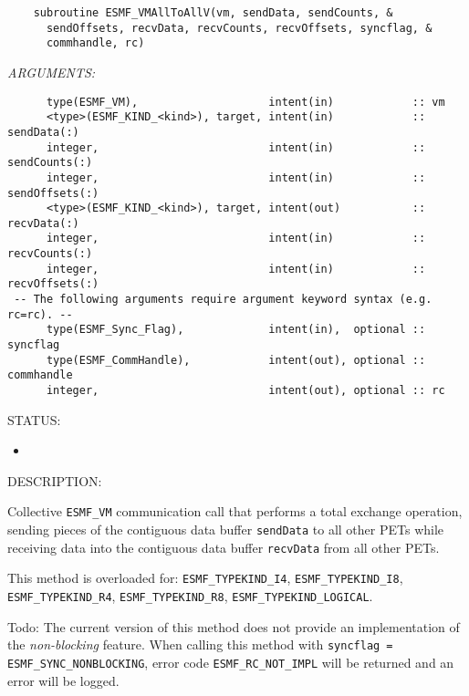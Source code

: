   
\begin{verbatim}    subroutine ESMF_VMAllToAllV(vm, sendData, sendCounts, &
      sendOffsets, recvData, recvCounts, recvOffsets, syncflag, &
      commhandle, rc)\end{verbatim}{\em ARGUMENTS:}
\begin{verbatim}      type(ESMF_VM),                    intent(in)            :: vm
      <type>(ESMF_KIND_<kind>), target, intent(in)            :: sendData(:)
      integer,                          intent(in)            :: sendCounts(:)
      integer,                          intent(in)            :: sendOffsets(:)
      <type>(ESMF_KIND_<kind>), target, intent(out)           :: recvData(:)
      integer,                          intent(in)            :: recvCounts(:)
      integer,                          intent(in)            :: recvOffsets(:)
 -- The following arguments require argument keyword syntax (e.g. rc=rc). --
      type(ESMF_Sync_Flag),             intent(in),  optional :: syncflag
      type(ESMF_CommHandle),            intent(out), optional :: commhandle
      integer,                          intent(out), optional :: rc\end{verbatim}
{\sf STATUS:}
   \begin{itemize}
   \item{}
   \end{itemize}
  
{\sf DESCRIPTION:\\ }


     Collective {\tt ESMF\_VM} communication call that performs a total exchange
     operation, sending pieces of the contiguous data buffer {\tt sendData} to
     all other PETs while receiving data into the contiguous data buffer
     {\tt recvData} from all other PETs.
  
     This method is overloaded for:
     {\tt ESMF\_TYPEKIND\_I4}, {\tt ESMF\_TYPEKIND\_I8},
     {\tt ESMF\_TYPEKIND\_R4}, {\tt ESMF\_TYPEKIND\_R8}, 
     {\tt ESMF\_TYPEKIND\_LOGICAL}.
  
     {\sc Todo:} The current version of this method does not provide an 
     implementation of the {\em non-blocking} feature. When calling this 
     method with {\tt syncflag = ESMF\_SYNC\_NONBLOCKING}, error code 
     {\tt ESMF\_RC\_NOT\_IMPL} will be returned and an error will be 
     logged.
  
